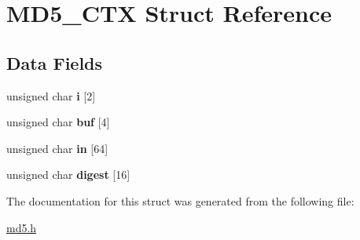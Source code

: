 \hypertarget{structMD5__CTX}{}\section{MD5\+\_\+\+C\+TX Struct Reference}
\label{structMD5__CTX}
\subsection*{Data Fields}
\begin{DoxyCompactItemize}
\item 
\mbox{\label{structMD5__CTX_aca79322e9b6d28aec292061cb3d887fc}} 
unsigned char {\bfseries i} \mbox{[}2\mbox{]}
\item 
\mbox{\label{structMD5__CTX_abbe7ae03b0edd5ab685dbb1afe38f2a5}} 
unsigned char {\bfseries buf} \mbox{[}4\mbox{]}
\item 
\mbox{\label{structMD5__CTX_ad7c0e27c818a56e6601d9cf0d0a785a0}} 
unsigned char {\bfseries in} \mbox{[}64\mbox{]}
\item 
\mbox{\label{structMD5__CTX_aad4ff5a61733cde2709a43b2485a0063}} 
unsigned char {\bfseries digest} \mbox{[}16\mbox{]}
\end{DoxyCompactItemize}


The documentation for this struct was generated from the following file\+:\begin{DoxyCompactItemize}
\item 
\mbox{\hyperlink{md5_8h}{md5.\+h}}\end{DoxyCompactItemize}
